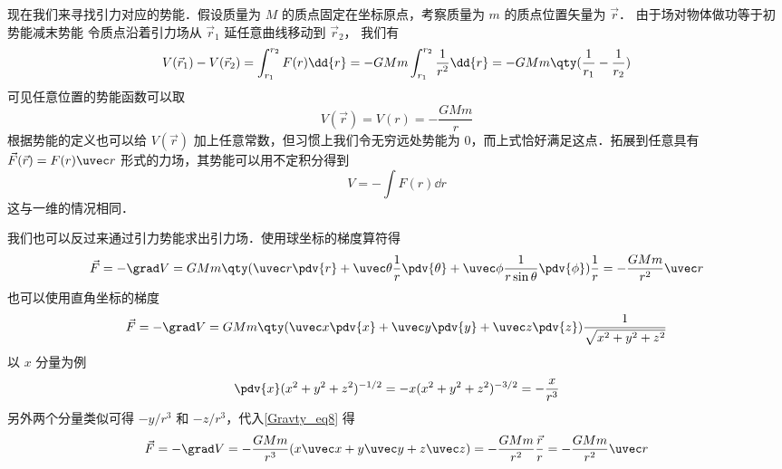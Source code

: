 现在我们来寻找引力对应的势能．假设质量为 $M$ 的质点固定在坐标原点，考察质量为 $m$ 的质点位置矢量为 $\vec r$． 由于场对物体做功等于初势能减末势能
令质点沿着引力场从 ${\vec r_1}$ 延任意曲线移动到 $\vec r_2$， 我们有
\begin{equation}
V(\vec r_1) - V(\vec r_2) = \int_{r_1}^{r_2} F(r) \dd{r} =  - GMm\int_{r_1}^{r_2} \frac{1}{r^2} \dd{r}  =  - GMm \qty( \frac{1}{r_1} - \frac{1}{r_2} )
\end{equation}
可见任意位置的势能函数可以取
\begin{equation}
V(\vec r) = V(r) = - \frac{GMm}{r}
\end{equation}
根据势能的定义也可以给 $V(\vec r)$ 加上任意常数，但习惯上我们令无穷远处势能为 0，而上式恰好满足这点．拓展到任意具有 $\vec F(\vec r) = F(r)\uvec r$ 形式的力场，其势能可以用不定积分得到
\begin{equation}\label{Gravty_eq7}
V = -\int F(r) \dd{r}
\end{equation}
这与一维的情况相同．%

我们也可以反过来通过引力势能求出引力场．使用球坐标的梯度算符得%
\begin{equation}
\vec F = -\grad V = GMm \qty( \uvec r\pdv{r} + \uvec \theta \frac{1}{r}\pdv{\theta} + \uvec \phi \frac{1}{r\sin \theta}\pdv{\phi} )\frac{1}{r} =  - \frac{GMm}{r^2}\uvec r
\end{equation}
也可以使用直角坐标的梯度
\begin{equation}\label{Gravty_eq8}
\vec F = -\grad V = GMm \qty(\uvec x\pdv{x} + \uvec y\pdv{y} + \uvec z\pdv{z} )\frac{1}{\sqrt{x^2 + y^2 + z^2}}
\end{equation}
以 $x$ 分量为例
\begin{equation}
\pdv{x}(x^2 + y^2 + z^2)^{-1/2} =  - x(x^2 + y^2 + z^2)^{-3/2} =  - \frac{x}{r^3}
\end{equation}
另外两个分量类似可得 $- y/r^3$ 和 $- z/r^3$，代入\autoref{Gravty_eq8} 得
\begin{equation}
\vec F = -\grad V =  - \frac{GMm}{r^3} (x\uvec x + y\uvec y + z\uvec z) =  - \frac{GMm}{r^2}\frac{\vec r}{r} =  - \frac{GMm}{r^2}\uvec r
\end{equation}
